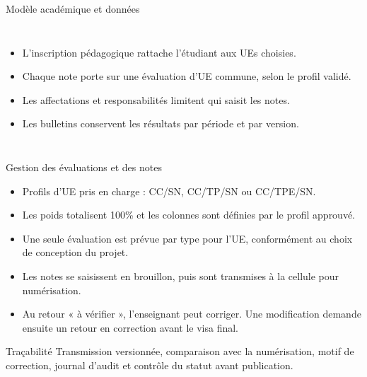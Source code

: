 \documentclass[aspectratio=169,12pt]{beamer}
\begin{document}
\begin{frame}{Modèle académique et données}
  \begin{columns}[T,onlytextwidth]
      \begin{itemize}
        \item L’inscription pédagogique rattache l’étudiant aux UEs choisies.
        \item Chaque note porte sur une évaluation d’UE commune, selon le profil validé.
        \item Les affectations et responsabilités limitent qui saisit les notes.
        \item Les bulletins conservent les résultats par période et par version.
      \end{itemize}
  \end{columns}
\end{frame}

\begin{frame}{Gestion des évaluations et des notes}
  \begin{itemize}
    \item Profils d’UE pris en charge : CC/SN, CC/TP/SN ou CC/TPE/SN.
    \item Les poids totalisent 100\% et les colonnes sont définies par le profil approuvé.
    \item Une seule évaluation est prévue par type pour l’UE, conformément au choix de conception du projet.
    \item Les notes se saisissent en brouillon, puis sont transmises à la cellule pour numérisation.
    \item Au retour « à vérifier », l’enseignant peut corriger. Une modification demande ensuite un retour en correction avant le visa final.
  \end{itemize}
  \begin{block}{Traçabilité}
    Transmission versionnée, comparaison avec la numérisation, motif de correction, journal d’audit et contrôle du statut avant publication.
  \end{block}
\end{frame}
\end{document}
